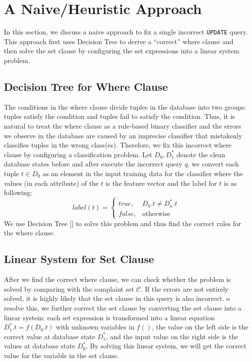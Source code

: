 \section{A Naive/Heuristic Approach}
In this section, we discuss a naive approach to fix
a single incorrect \texttt{UPDATE} query. 
This approach first uses 
Decision Tree to derive a ``correct'' where clause 
and then solve the set clause by configuring the set 
expressions into a linear system problem. 
\subsection{Decision Tree for Where Clause}
The conditions in the where clause divide tuples in
the database into two groups: tuples satisfy 
the condition and tuples fail to satisfy the condition. 
Thus, it is natural to treat the where clause as a rule-based
binary classifier and the errors we observe in the database 
are caused by an imprecise classifier that mistakenly 
classifies tuples in the wrong class(es). Therefore, 
we fix this incorrect
where clause by configuring a classification problem.
Let $D_0, D_1^*$ denote the clean database states before and after 
execute the incorrect query $q$, 
we convert each tuple $t \in D_0$ as 
an element in the input training data for the classifier where
the values (in each attribute) of the $t$ is the feature vector 
and the label for $t$ is as following:
	\[
    label(t)= 
    \begin{cases}
    true ,& D_0.t \neq D_n^*.t\\
    false,              & \text{otherwise}
    \end{cases}
\]
We use Decision Tree [] to solve this problem and thus find the correct 
rules for the where clause. 
\subsection{Linear System for Set Clause}
After we find the correct where clause, we can check whether the problem
is solved by comparing 
with the complaint set $\mathcal{C}$. If the errors are not entirely solved, 
it is highly likely that the set clause in this query is also incorrect. 
o resolve this, we further correct the set clause by converting the set
clause into a linear system: each set expression is transformed into a linear
equation $D_1^*.t = f(D_0.t)$ with unknown variables in $f()$, 
the value on the left side is the correct value at database state $D_1^*$, 
and the input value on the right side is the values at database state $D_0^*$.
By solving this linear system, we will get the correct value for the variable 
in the set clause. 
